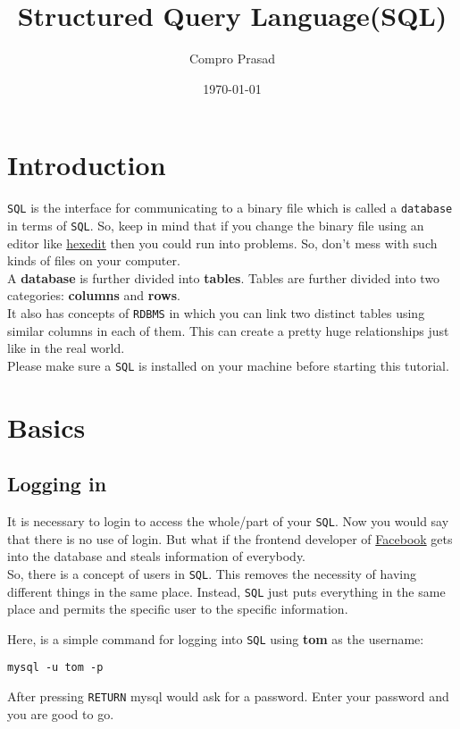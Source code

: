 \documentclass[11pt]{article}
\author{Compro Prasad}
\date{\today}
\title{Structured Query Language(SQL)}
\begin{document}
\maketitle
\tableofcontents

\section{Introduction}
\label{sec:org90b5d32}
\texttt{SQL} is the interface for communicating to a binary file
which is called a \texttt{database} in terms of \texttt{SQL}. So, keep in
mind that if you change the binary file using an editor like
\href{http://hexedit.com/}{hexedit} then you could run into problems. So, don't mess
with such kinds of files on your computer.\\
A \textbf{database} is further divided into \textbf{tables}. Tables are further
divided into two categories: \textbf{columns} and \textbf{rows}.\\
It also has concepts of \texttt{RDBMS} in which you can link two
distinct tables using similar columns in each of them. This
can create a pretty huge relationships just like in the real world.\\
Please make sure a \texttt{SQL} is installed on your machine before
starting this tutorial.
\section{Basics}
\label{sec:orgf1a7fc7}
\subsection{Logging in}
\label{sec:org737b541}
It is necessary to login to access the whole/part of your
\texttt{SQL}. Now you would say that there is no use of login. But
what if the frontend developer of \href{https://facebook.com}{Facebook} gets into the
database and steals information of everybody.\\
So, there is a concept of users in \texttt{SQL}. This removes the
necessity of having different things in the same place.
Instead, \texttt{SQL} just puts everything in the same place and
permits the specific user to the specific information.

Here, is a simple command for logging into \texttt{SQL} using
\textbf{tom} as the username:
\begin{verbatim}
mysql -u tom -p
\end{verbatim}
After pressing \texttt{RETURN} mysql would ask for a password.
Enter your password and you are good to go.
\end{document}
